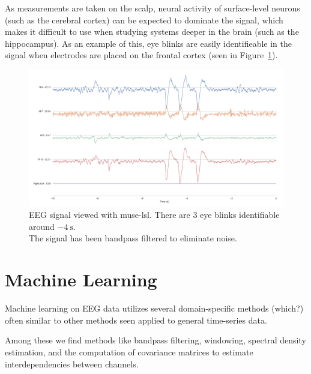     As measurements are taken on the scalp, neural activity of surface-level neurons (such as the cerebral cortex) can be expected to dominate the signal, which makes it difficult to use when studying systems deeper in the brain (such as the hippocampus). As an example of this, eye blinks are easily identifieable in the signal when electrodes are placed on the frontal cortex (seen in Figure~\ref{fig:muselsl-signal}).



    \begin{figure}
        \begin{center}
            \includegraphics[trim=60 50 50 60,clip,width=24cm]{img/muselsl-signal.png}
        \end{center}
        \caption{EEG signal viewed with muse-lsl. There are 3 eye blinks identifiable around $\SI{-4}{\second}$.\\ The signal has been bandpass filtered to eliminate noise.}\label{fig:muselsl-signal}
    \end{figure}

\section{Machine Learning}

    Machine learning on EEG data utilizes several domain-specific methods (which?) often similar to other methods seen applied to general time-series data.

    Among these we find methods like bandpass filtering, windowing, spectral density estimation, and the computation of covariance matrices to estimate interdependencies between channels.

